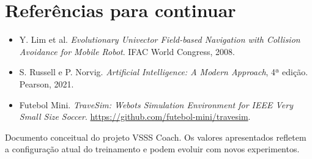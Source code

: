 \documentclass[11pt,a4paper]{article}
\begin{document}
\section*{Referências para continuar}
\begin{itemize}
  \item Y. Lim et al. \emph{Evolutionary Univector Field-based Navigation with
  Collision Avoidance for Mobile Robot}. IFAC World Congress, 2008.
  \item S. Russell e P. Norvig. \emph{Artificial Intelligence: A Modern
  Approach}, 4ª edição. Pearson, 2021.
  \item Futebol Mini. \emph{TraveSim: Webots Simulation Environment for IEEE
  Very Small Size Soccer}. \url{https://github.com/futebol-mini/travesim}.
\end{itemize}

\vfill
\begin{center}\small
Documento conceitual do projeto VSSS Coach. Os valores apresentados refletem
a configuração atual do treinamento e podem evoluir com novos experimentos.
\end{center}
\end{document}
